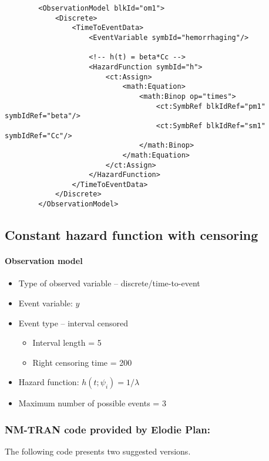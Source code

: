 \lstset{language=XML}
\begin{lstlisting}
        <ObservationModel blkId="om1">
            <Discrete>
                <TimeToEventData>
                    <EventVariable symbId="hemorrhaging"/>
                    
                    <!-- h(t) = beta*Cc -->
                    <HazardFunction symbId="h">
                        <ct:Assign>
                            <math:Equation>
                                <math:Binop op="times">
                                    <ct:SymbRef blkIdRef="pm1" symbIdRef="beta"/>
                                    <ct:SymbRef blkIdRef="sm1" symbIdRef="Cc"/>
                                </math:Binop>
                            </math:Equation>
                        </ct:Assign>   
                    </HazardFunction>
                </TimeToEventData>
            </Discrete>
        </ObservationModel>
\end{lstlisting}



\subsection{Constant hazard function with censoring}

\paragraph{Observation model}

\begin{itemize}
\item
Type of observed variable -- discrete/time-to-event
\item
Event variable: $y$
\item
Event type -- interval censored
\begin{itemize}
\item
Interval length = 5
\item
Right censoring time = 200
\end{itemize}
\item
Hazard function: $h(t; \psi_i) = 1/\lambda$
\item
Maximum number of possible events = 3
\end{itemize}


\subsubsection{NM-TRAN code provided by Elodie Plan:}
The following code presents two suggested versions.

